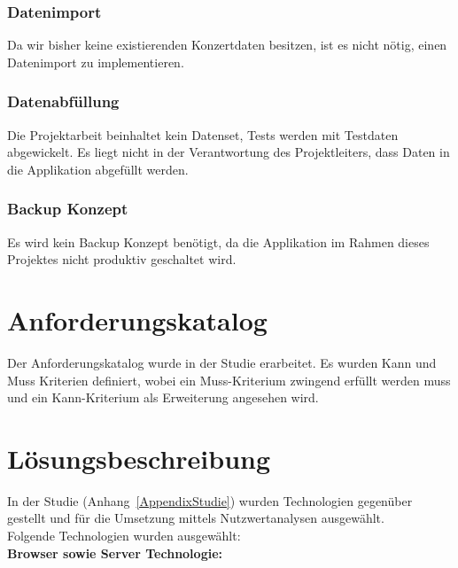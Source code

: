 \subsubsection{Datenimport}\label{datenimport}

Da wir bisher keine existierenden Konzertdaten besitzen, ist es nicht
nötig, einen Datenimport zu implementieren.

\subsubsection{Datenabfüllung}\label{datenabfuxfcllung}

Die Projektarbeit beinhaltet kein Datenset, Tests werden mit Testdaten
abgewickelt. Es liegt nicht in der Verantwortung des Projektleiters,
dass Daten in die Applikation abgefüllt werden.

\subsubsection{Backup Konzept}\label{backup-konzept}

Es wird kein Backup Konzept benötigt, da die Applikation im Rahmen
dieses Projektes nicht produktiv geschaltet wird.

\clearpage
\section{Anforderungskatalog}\label{anforderungskatalog}

Der Anforderungskatalog wurde in der Studie erarbeitet. Es wurden Kann und Muss
Kriterien definiert, wobei ein Muss-Kriterium zwingend erfüllt werden muss und
ein Kann-Kriterium als Erweiterung angesehen wird.



\clearpage
\section{Lösungsbeschreibung}\label{loesungsbeschreibung}

In der Studie (Anhang~\ref{AppendixStudie}) wurden Technologien gegenüber
gestellt und für die Umsetzung mittels Nutzwertanalysen ausgewählt.\\

\noindent
Folgende Technologien wurden ausgewählt:\\

\textbf{Browser sowie Server Technologie:}

